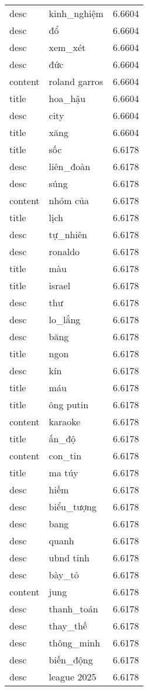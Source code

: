 \documentclass{article}
\begin{document}
\begin{tabular}{lll}
desc & kinh\_nghiệm & 6.6604\\
desc & đổ & 6.6604\\
desc & xem\_xét & 6.6604\\
desc & đức & 6.6604\\
content & roland garros & 6.6604\\
title & hoa\_hậu & 6.6604\\
desc & city & 6.6604\\
title & xăng & 6.6604\\
title & sốc & 6.6178\\
desc & liên\_đoàn & 6.6178\\
desc & súng & 6.6178\\
content & nhóm của & 6.6178\\
title & lịch & 6.6178\\
desc & tự\_nhiên & 6.6178\\
desc & ronaldo & 6.6178\\
title & màu & 6.6178\\
title & israel & 6.6178\\
desc & thư & 6.6178\\
desc & lo\_lắng & 6.6178\\
desc & băng & 6.6178\\
title & ngon & 6.6178\\
desc & kín & 6.6178\\
title & máu & 6.6178\\
title & ông putin & 6.6178\\
content & karaoke & 6.6178\\
title & ấn\_độ & 6.6178\\
content & con\_tin & 6.6178\\
title & ma túy & 6.6178\\
desc & hiếm & 6.6178\\
desc & biểu\_tượng & 6.6178\\
desc & bang & 6.6178\\
desc & quanh & 6.6178\\
desc & ubnd tỉnh & 6.6178\\
desc & bày\_tỏ & 6.6178\\
content & jung & 6.6178\\
desc & thanh\_toán & 6.6178\\
desc & thay\_thế & 6.6178\\
desc & thông\_minh & 6.6178\\
desc & biến\_động & 6.6178\\
desc & league 2025 & 6.6178\\

\end{tabular}
\end{document}

